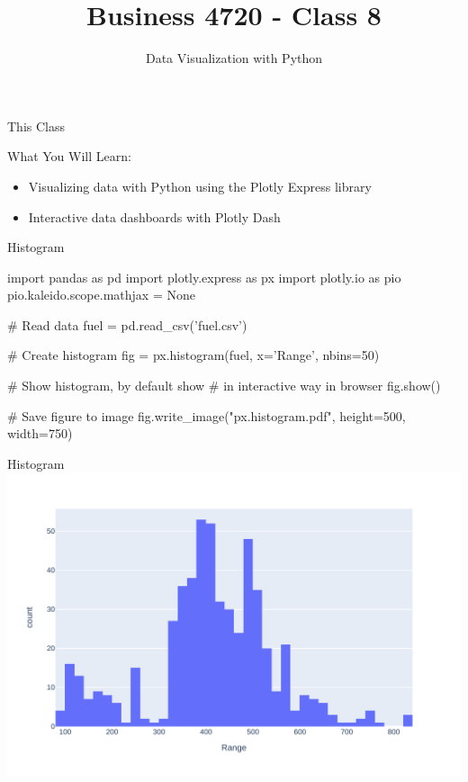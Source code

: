 \documentclass[ignorenonframetext,xcolor=x11names]{beamer}
\title{Business 4720 - Class 8}
\subtitle{Data Visualization with Python}
\begin{document}
\begin{frame}{}
  \titlepage
  \footnotesize
  
\end{frame}

\begin{frame}{This Class}

\begin{block}{What You Will Learn:}
\begin{itemize}
  \item Visualizing data with Python using the Plotly Express library
  \item Interactive data dashboards with Plotly Dash
\end{itemize}
\end{block}
\end{frame}


\begin{frame}[fragile]{Histogram}
\footnotesize
\begin{pythoncode}
import pandas as pd
import plotly.express as px
import plotly.io as pio
pio.kaleido.scope.mathjax = None

# Read data
fuel = pd.read_csv('fuel.csv')

# Create histogram
fig = px.histogram(fuel, x='Range', nbins=50)

# Show histogram, by default show 
# in interactive way in browser
fig.show()

# Save figure to image
fig.write_image("px.histogram.pdf", 
       height=500, width=750)
\end{pythoncode}
\end{frame}

\begin{frame}{Histogram}
    \includegraphics[width=\textwidth]{px.histogram.pdf}
\end{frame}
\end{document}
